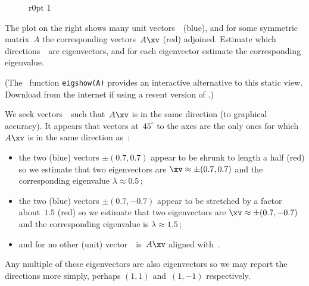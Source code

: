 \begin{wrapfigure}r{0pt}
\def\eRosesize{small}%
1
\end{wrapfigure}
\begin{example} \label{eg:eig2pic1}
The plot on the right shows many unit vectors~\xv\  (blue), and for some symmetric matrix~\(A\) the corresponding vectors~\(A\xv\) (red) adjoined. 
Estimate which directions~\xv\ are eigenvectors, and for each eigenvector estimate the corresponding eigenvalue.

(The \script[1]\ function \texttt{eigshow(A)} provides an interactive alternative to this static view.
Download from the internet if using a recent version of \script[1].)

\begin{solution} 
We seek vectors~\xv\ such that~\(A\xv\) is in the same direction (to graphical accuracy).
It appears that vectors at~\(45^\circ\) to the axes are the only ones for which \(A\xv\) is in the same direction as~\xv:  \begin{itemize}
\item the two (blue) vectors \(\pm(0.7,0.7)\) appear to be shrunk to length a half (red) so we estimate that two eigenvectors are \(\xv\approx\pm(0.7,0.7)\) and the corresponding eigenvalue  \(\lambda\approx0.5\)\,;
\item the two (blue) vectors \(\pm(0.7,-0.7)\)  appear to be stretched by a factor about~\(1.5\) (red) so we estimate that two eigenvectors are \(\xv\approx\pm(0.7,-0.7)\) and the corresponding eigenvalue is \(\lambda\approx1.5\)\,;
\item and for no other (unit) vector~\xv\ is~\(A\xv\) aligned with~\xv.
\end{itemize}
Any multiple of these eigenvectors are also eigenvectors so we may report the directions more simply, perhaps \((1,1)\) and~\((1,-1)\) respectively.
\end{solution}
\end{example}

